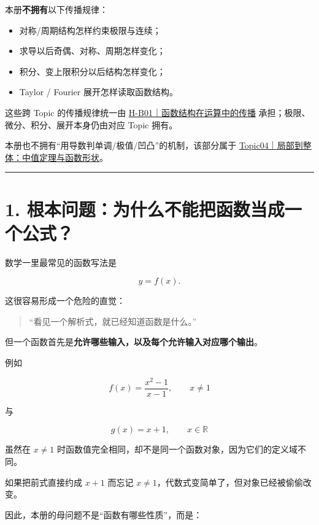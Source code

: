 \documentclass[11pt,a4paper]{ctexart}
\providecommand{\tightlist}{}
\begin{document}
本册\textbf{不拥有}以下传播规律：

\begin{itemize}
\tightlist
\item
  对称/周期结构怎样约束极限与连续；
\item
  求导以后奇偶、对称、周期怎样变化；
\item
  积分、变上限积分以后结构怎样变化；
\item
  Taylor / Fourier 展开怎样读取函数结构。
\end{itemize}

这些跨 Topic 的传播规律统一由
\href{../50_桥梁专题/H-B01_函数结构在运算中的传播/README.md}{H-B01｜函数结构在运算中的传播}
承担；极限、微分、积分、展开本身仍由对应 Topic 拥有。

本册也不拥有``用导数判单调/极值/凹凸''的机制，该部分属于
\href{../04_局部到整体_中值定理与函数形状/README.md}{Topic04｜局部到整体：中值定理与函数形状}。

\begin{center}\rule{0.5\linewidth}{0.5pt}\end{center}

\section{1.
根本问题：为什么不能把函数当成一个公式？}\label{ux6839ux672cux95eeux9898ux4e3aux4ec0ux4e48ux4e0dux80fdux628aux51fdux6570ux5f53ux6210ux4e00ux4e2aux516cux5f0f}

数学一里最常见的函数写法是

\[
y=f(x).
\]

这很容易形成一个危险的直觉：

\begin{quote}
``看见一个解析式，就已经知道函数是什么。''
\end{quote}

但一个函数首先是\textbf{允许哪些输入，以及每个允许输入对应哪个输出}。

例如

\[
f(x)=\frac{x^2-1}{x-1},\qquad x\ne1
\]

与

\[
g(x)=x+1,\qquad x\in\mathbb R
\]

虽然在 \(x\ne1\)
时函数值完全相同，却不是同一个函数对象，因为它们的定义域不同。

如果把前式直接约成 \(x+1\) 而忘记
\(x\ne1\)，代数式变简单了，但对象已经被偷偷改变。

因此，本册的母问题不是``函数有哪些性质''，而是：
\end{document}
